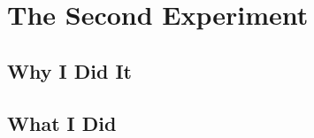 
\chapter{The Second Experiment}
\label{cha:secondexp}

\section{Why I Did It}
\label{sec:why2}

\section{What I Did}
\label{sec:what2}

